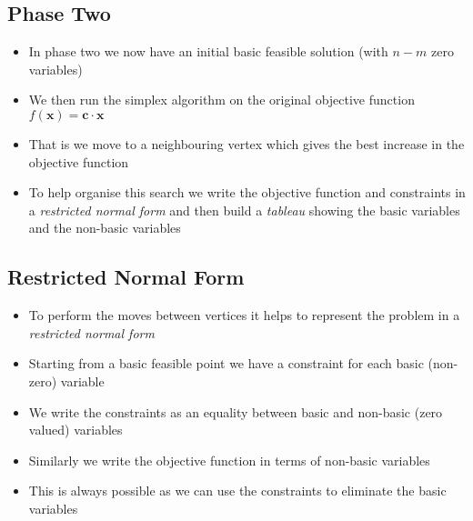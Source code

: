 \Outline %

\begin{slide}
\section{Phase Two}

\begin{PauseHighLight}
  \begin{itemize}
  \item In phase two we now have an initial basic feasible solution
    (with $n-m$ zero variables)\pause
  \item We then run the simplex algorithm on the original objective
    function $f(\bm{x}) = \bm{c} \cdot \bm{x}$\pause
  \item That is we move to a neighbouring vertex which gives the best
    increase in the objective function\pause
  \item To help organise this search we write the objective function and
    constraints in a \emph{restricted normal form} and then build a
    \emph{tableau} showing the basic variables and the non-basic
    variables\pause
  \end{itemize}
\end{PauseHighLight}

\end{slide}


\begin{slide}
\section{Restricted Normal Form}

\begin{PauseHighLight}
  \begin{itemize}
  \item To perform the moves between vertices it helps to represent the
    problem in a \emph{restricted normal form}\pause
  \item Starting from a basic feasible point we have a constraint for
    each basic (non-zero) variable\pause
  \item We write the constraints as an equality between basic and
    non-basic (zero valued) variables\pause
  \item Similarly we write the objective function in terms of non-basic
    variables\pause
  \item This is always possible as we can use the constraints to
    eliminate the basic variables\pause
  \end{itemize}
\end{PauseHighLight}

\end{slide}

